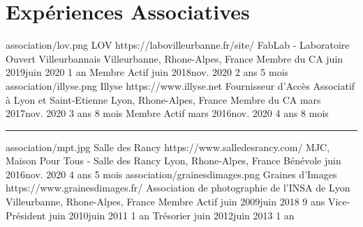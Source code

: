 \documentclass[singlesided,
  paper=a4,
  fontsize=10pt
]{resume}
\begin{document}
{  \section[\fa{hands-helping}]{Expériences Associatives}
    \volunteerorganization%
      {association/lov.png}%
      {LOV}%
      {https://labovilleurbanne.fr/site/}%
      {FabLab - Laboratoire Ouvert Villeurbannais}%
      {Villeurbanne, Rhone-Alpes, France}%
      {
        \volunteerposition%
          {Membre du CA}%
          {juin 2019\textendash juin 2020}%
          {1 an}%
          {}
        \volunteerposition%
          {Membre Actif}%
          {juin 2018\textendash nov. 2020}%
          {2 ans 5 mois}%
          {}
      }
      \hspace{0.01\linewidth}{\color{midrules}\vline}\hfill
    \volunteerorganization%
      {association/illyse.png}%
      {Illyse}%
      {https://www.illyse.net}%
      {Fournisseur d'Accès Associatif à Lyon et Saint-Etienne}%
      {Lyon, Rhone-Alpes, France}%
      {
        \volunteerposition%
          {Membre du CA}%
          {mars 2017\textendash nov. 2020}%
          {3 ans 8 mois}%
          {}
        \volunteerposition%
          {Membre Actif}%
          {mars 2016\textendash nov. 2020}%
          {4 ans 8 mois}%
          {}
      }
      \textcolor{midrules}{\rule{\linewidth}{0.5pt}}%
      \vspace{-1em}
    \volunteerorganization%
      {association/mpt.jpg}%
      {Salle des Rancy}%
      {https://www.salledesrancy.com/}%
      {MJC, Maison Pour Tous - Salle des Rancy}%
      {Lyon, Rhone-Alpes, France}%
      {
        \volunteerposition%
          {Bénévole}%
          {juin 2016\textendash nov. 2020}%
          {4 ans 5 mois}%
          {}
      }
      \hspace{0.01\linewidth}{\color{midrules}\vline}\hfill
    \volunteerorganization%
      {association/grainesdimages.png}%
      {Graines d'Images}%
      {https://www.grainesdimages.fr/}%
      {Association de photographie de l'INSA de Lyon}%
      {Villeurbanne, Rhone-Alpes, France}%
      {
        \volunteerposition%
          {Membre Actif}%
          {juin 2009\textendash juin 2018}%
          {9 ans}%
          {}
        \volunteerposition%
          {Vice-Président}%
          {juin 2010\textendash juin 2011}%
          {1 an}%
          {}
        \volunteerposition%
          {Trésorier}%
          {juin 2012\textendash juin 2013}%
          {1 an}%
          {}
      }
  \vspace{-1.5em}
}
\end{document}
